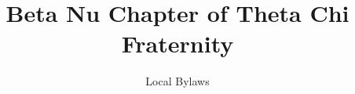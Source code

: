 \documentclass[oneside,openany]{book}
\title{Beta Nu Chapter of Theta Chi Fraternity}
\author{Local Bylaws}
\begin{document}
\maketitle
\frontmatter
\tableofcontents



\mainmatter


\glsresetall %

\glsresetall

\glsresetall

\glsresetall

\glsresetall

\glsresetall

\glsresetall

\glsresetall

\glsresetall

\glsresetall

\glsresetall

\glsresetall

\glsresetall

\glsaddall
\printglossaries

\appendix





\end{document}
